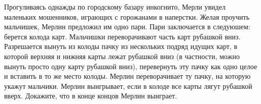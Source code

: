 \begin{problems}
\item Прогуливаясь однажды по городскому базару инкогнито, Мерли увидел маленьких мошенников, играющих с горожанами в наперстки. Желая проучить мальчишек, Мерлин предложил им одно пари. Пари заключается в следуюшем: берется колода карт. Мальчишки переворачивают часть карт рубашкой вниз. Разрешается вынуть из колоды пачку из нескольких подряд идущих карт, в которой верхняя и нижняя карты лежат рубашкой вниз (в частности, можно вынуть просто одну карту рубашкой вниз), перевернуть эту пачку как одно целое и вставить в то же место колоды. Мерлин переворачивает ту пачку, на которую укажут мальчики. Мерлин выигрывает, если в колоде все карты лягут рубашкой вверх. Докажите, что в конце концов Мерлин выиграет.

\end{problems}